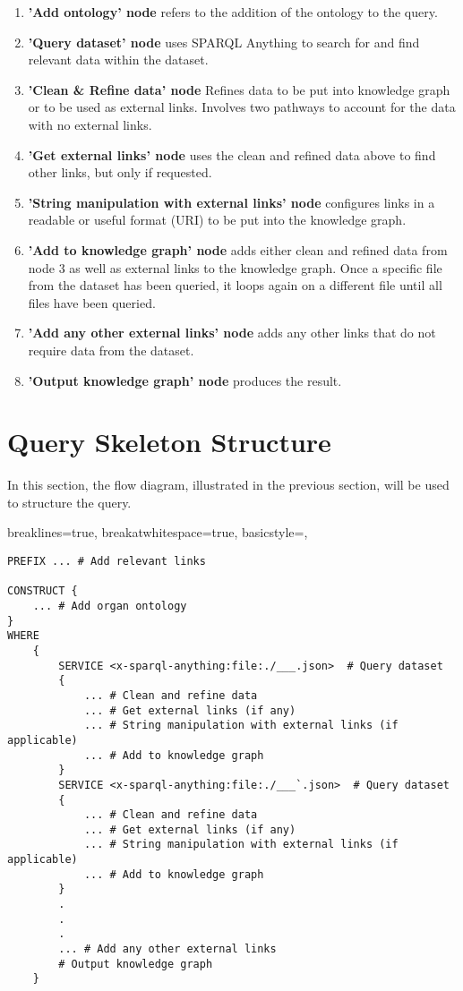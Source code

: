 \begin{enumerate}
  \item \textbf{'Add ontology' node} refers to the addition of the ontology to the query.
  \item \textbf{'Query dataset' node} uses SPARQL Anything to search for and find relevant data within the dataset.
  \item \textbf{'Clean \& Refine data' node} Refines data to be put into knowledge graph or to be used as external links. Involves two pathways to account for the data with no external links.
  \item \textbf{'Get external links' node} uses the clean and refined data above to find other links, but only if requested.
  \item \textbf{'String manipulation with external links' node} configures links in a readable or useful format (URI) to be put into the knowledge graph.
  \item \textbf{'Add to knowledge graph' node} adds either clean and refined data from node 3 as well as external links to the knowledge graph. Once a specific file from the dataset has been queried, it loops again on a different file until all files have been queried.
  \item \textbf{'Add any other external links' node} adds any other links that do not require data from the dataset.
  \item \textbf{'Output knowledge graph' node} produces the result.
\end{enumerate}

\section{Query Skeleton Structure}
\hspace{0.5cm} In this section, the flow diagram, illustrated in the previous section, will be used to structure the query.

\lstset
{
    breaklines=true,
    breakatwhitespace=true,
    basicstyle=\ttfamily,
}
\begin{lstlisting}
PREFIX ... # Add relevant links

CONSTRUCT {
    ... # Add organ ontology
} 
WHERE 
    { 
        SERVICE <x-sparql-anything:file:./___.json>  # Query dataset
        { 
            ... # Clean and refine data
            ... # Get external links (if any)
            ... # String manipulation with external links (if applicable)
            ... # Add to knowledge graph
        } 
        SERVICE <x-sparql-anything:file:./___`.json>  # Query dataset
        { 
            ... # Clean and refine data
            ... # Get external links (if any)
            ... # String manipulation with external links (if applicable)
            ... # Add to knowledge graph
        } 
        .
        .
        .
        ... # Add any other external links 
        # Output knowledge graph
    }

\end{lstlisting}

